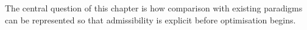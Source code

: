 The central question of this chapter is how comparison with existing paradigms can be represented so that admissibility is explicit before optimisation begins.
